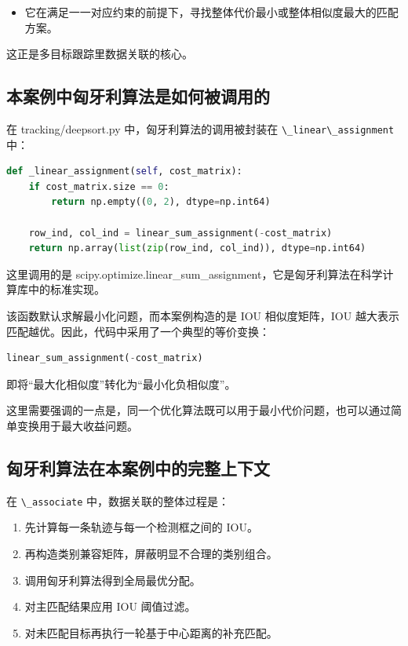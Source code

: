 \begin{itemize}
\tightlist
\item
  它在满足一一对应约束的前提下，寻找整体代价最小或整体相似度最大的匹配方案。
\end{itemize}

这正是多目标跟踪里数据关联的核心。

\subsection{本案例中匈牙利算法是如何被调用的}\label{src-experiment-case2-h52}

在 tracking/deepsort.py 中，匈牙利算法的调用被封装在
\passthrough{\lstinline!\_linear\_assignment!} 中：

\begin{lstlisting}[language=Python]
def _linear_assignment(self, cost_matrix):
    if cost_matrix.size == 0:
        return np.empty((0, 2), dtype=np.int64)

    row_ind, col_ind = linear_sum_assignment(-cost_matrix)
    return np.array(list(zip(row_ind, col_ind)), dtype=np.int64)
\end{lstlisting}

这里调用的是
scipy.optimize.linear\_sum\_assignment，它是匈牙利算法在科学计算库中的标准实现。

该函数默认求解最小化问题，而本案例构造的是 IOU 相似度矩阵，IOU
越大表示匹配越优。因此，代码中采用了一个典型的等价变换：

\begin{lstlisting}[language=Python]
linear_sum_assignment(-cost_matrix)
\end{lstlisting}

即将``最大化相似度''转化为``最小化负相似度''。

这里需要强调的一点是，同一个优化算法既可以用于最小代价问题，也可以通过简单变换用于最大收益问题。

\subsection{匈牙利算法在本案例中的完整上下文}\label{src-experiment-case2-h53}

在 \passthrough{\lstinline!\_associate!} 中，数据关联的整体过程是：

\begin{enumerate}
\def\labelenumi{\arabic{enumi}.}
\tightlist
\item
  先计算每一条轨迹与每一个检测框之间的 IOU。
\item
  再构造类别兼容矩阵，屏蔽明显不合理的类别组合。
\item
  调用匈牙利算法得到全局最优分配。
\item
  对主匹配结果应用 IOU 阈值过滤。
\item
  对未匹配目标再执行一轮基于中心距离的补充匹配。
\end{enumerate}


